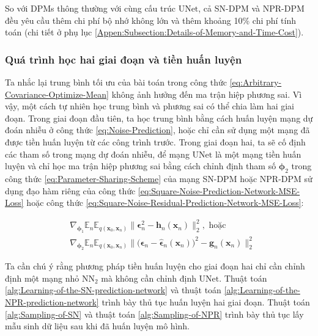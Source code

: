 \documentclass[14pt, a4paper]{article}
\numberwithin{equation}{section}
\numberwithin{figure}{section}
\numberwithin{dl}{section}
\numberwithin{md}{section}
\numberwithin{bd}{section}
\numberwithin{dn}{section}
\numberwithin{hq}{section}
\begin{document}
    So với DPMs thông thường với cùng cấu trúc $\mathrm{UNet}$, cả SN-DPM và NPR-DPM đều yêu cầu thêm chi phí bộ nhớ không lớn và thêm khoảng 10\% chi phí tính toán (chi tiết ở phụ lục \ref{Appen:Subsection:Details-of-Memory-and-Time-Cost}).

    \subsubsection{Quá trình học hai giai đoạn và tiền huấn luyện} \label{Subsection:Two-Stage-Learning-and-Pretraining}

    Ta nhắc lại trung bình tối ưu của bài toán trong công thức \ref{eq:Arbitrary-Covariance-Optimize-Mean} không ảnh hưởng đến ma trận hiệp phương sai.
    Vì vậy, một cách tự nhiên học trung bình và phương sai có thể chia làm hai giai đoạn.
    Trong giai đoạn đầu tiên, ta học trung bình bằng cách huấn luyện mạng dự đoán nhiễu ở công thức \ref{eq:Noise-Prediction},
    hoặc chỉ cần sử dụng một mạng đã được tiền huấn luyện từ các công trình trước.
    Trong giai đoạn hai, ta sẽ cố định các tham số trong mạng dự đoán nhiễu, để mạng $\mathrm{UNet}$ là một mạng tiền huấn luyện và chỉ học ma trận hiệp phương sai bằng cách chỉnh định tham số $\boldsymbol{\phi}_2$ trong công thức \ref{eq:Parameter-Sharing-Scheme} của mạng SN-DPM hoặc NPR-DPM sử dụng đạo hàm riêng của công thức \ref{eq:Square-Noise-Prediction-Network-MSE-Loss} hoặc công thức \ref{eq:Square-Noise-Residual-Prediction-Network-MSE-Loss}:

    \begin{equation}
        \begin{aligned}
        &\nabla_{\boldsymbol{\phi}_1} \mathbb{E}_n \mathbb{E}_{q(\boldsymbol{x}_0, \boldsymbol{x}_n)} \lVert \boldsymbol{\epsilon}_n^2 - \boldsymbol{h}_n (\boldsymbol{x}_n) \rVert_2^2, \text{ hoặc} \\
        &\nabla_{\boldsymbol{\phi}_2} \mathbb{E}_n \mathbb{E}_{q(\boldsymbol{x}_0, \boldsymbol{x}_n)} \lVert \big( \boldsymbol{\epsilon}_n - \hat{\boldsymbol{\epsilon}}_n (\boldsymbol{x}_n) \big)^2 - \boldsymbol{g}_n (\boldsymbol{x}_n) \rVert_2^2
        \end{aligned}
    \end{equation}

    Ta cần chú ý rằng phương pháp tiền huấn luyện cho giai đoạn hai chỉ cần chỉnh định một mạng nhỏ $\mathrm{NN}_2$ mà không cần chỉnh định $\mathrm{UNet}$.
    Thuật toán \ref{alg:Learning-of-the-SN-prediction-network} và thuật toán \ref{alg:Learning-of-the-NPR-prediction-network} trình bày thủ tục huấn luyện hai giai đoạn.
    Thuật toán \ref{alg:Sampling-of-SN} và thuật toán \ref{alg:Sampling-of-NPR} trình bày thủ tục lấy mẫu sinh dữ liệu sau khi đã huấn luyện mô hình.
\end{document}
